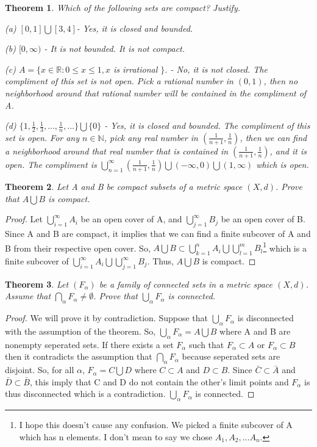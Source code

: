 \documentclass{article}
\theoremstyle{plain}
\newtheorem{theorem}{Theorem}
\theoremstyle{definition}
\begin{document}
\begin{theorem}
Which of the following sets are compact? Justify.

(a) $[0,1] \bigcup [3,4]$- Yes, it is closed and bounded.

(b) $[0,\infty)$ - It is not bounded. It is not compact.

(c) $A =  \{ x \in \mathbb{R}: 0 \leq x \leq 1, x $ is irrational $\}$. - No, it is not closed. The compliment of this set is not open. Pick a rational number in $(0,1)$, then no neighborhood around that rational number will be contained in the compliment of A. 

(d) $\{ 1, \frac{1}{2}, \frac{1}{3},...,\frac{1}{n},...\} \bigcup \{0\}$ - Yes, it is closed and bounded. The compliment of this set is open. For any $n \in \mathbb{N}$, pick any real number in $(\frac{1}{n + 1}, \frac{1}{n})$, then we can find a neighborhood around that real number that is contained in $(\frac{1}{n + 1}, \frac{1}{n})$, and it is open. The compliment is $ \bigcup_{n = 1}^{\infty} (\frac{1}{n + 1}, \frac{1}{n}) \bigcup (-\infty, 0) \bigcup (1, \infty)$ which is open.
\end{theorem}
\begin{theorem}
Let A and B be compact subsets of a metric space $(X,d)$. Prove that $A \bigcup B$ is compact.
\end{theorem}

\begin{proof}
Let $\bigcup_{i = 1}^{\infty} A_{i}$ be an open  cover of A, and $\bigcup_{j = 1}^{\infty} B_{j}$ be an open cover of B. Since A and B are compact, it implies that we can find a finite subcover of A and B from their respective open cover. So, $A \bigcup B \subset \bigcup_{k = 1}^{n} A_{i} \bigcup \bigcup_{l = 1}^{m} B_{l}$\footnote{I hope this doesn't cause any confusion. We picked a finite subcover of A which has n elements. I don't mean to say we chose $A_{1},A_{2},...A_{n}$. } which is a finite subcover of $\bigcup_{i = 1}^{\infty} A_{i} \bigcup \bigcup_{j = 1}^{\infty} B_{j}$. Thus, $A \bigcup B$ is compact.
\end{proof}

\begin{theorem}
Let $(F_{\alpha})$ be a family of connected sets in a metric space $(X,d)$. Assume that $\bigcap_{\alpha} F_{\alpha} \not = \emptyset$. Prove that $\bigcup_{\alpha} F_{\alpha}$ is connected.
\end{theorem}
\begin{proof}
We will prove it by contradiction. Suppose that $\bigcup_{\alpha} F_{\alpha}$ is disconnected with the assumption of the theorem. So, $ \bigcup_{\alpha} F_{\alpha} = A \bigcup B$ where A and B are nonempty seperated sets. If there exists a set $F_{\alpha}$ such that $F_{\alpha} \subset A$ or $F_{\alpha} \subset B$ then it contradicts the assumption that $\bigcap_{\alpha} F_{\alpha}$ because seperated sets are disjoint. So, for all $\alpha$, $F_{\alpha} = C \bigcup D$ where $C \subset A$ and $D \subset B$. Since $\bar{C} \subset \bar{A}$ and $\bar{D} \subset \bar{B}$, this imply that C and D do not contain the other's limit points and $F_{\alpha}$ is thus disconnected which is a contradiction. $\bigcup_{\alpha} F_{\alpha}$ is connected.
\end{proof}
\end{document}

